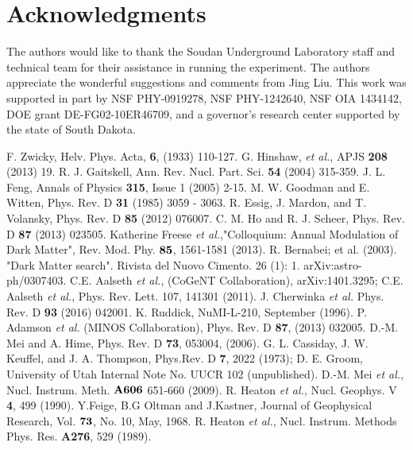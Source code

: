 \documentclass[aps,prc,showpacs,twocolumn,superscriptaddress]{revtex4-1}
\begin{document}
 \section*{Acknowledgments}
The authors would like to thank the Soudan Underground Laboratory staff and technical team for their assistance in running the experiment. The authors appreciate the wonderful suggestions and comments from Jing Liu. This work was supported in part by NSF PHY-0919278, NSF PHY-1242640, NSF OIA 1434142, DOE grant DE-FG02-10ER46709, and a governor's research center supported by the state of South Dakota.
\begin{thebibliography}{99}
 F. Zwicky, Helv. Phys. Acta, {\bf{6}}, (1933) 110-127.
 G. Hinshaw, {\it {et al.}}, APJS {\bf{208}} (2013) 19. 
 R. J. Gaitskell, Ann. Rev. Nucl. Part. Sci. {\bf{54}} (2004) 315-359.
 J. L. Feng, Annals of Physics {\bf{315}}, Issue 1 (2005) 2-15.
 M. W. Goodman and E. Witten, Phys. Rev. D {\bf{31}} (1985) 3059 - 3063. 
 R. Essig, J. Mardon, and T. Volansky, Phys. Rev. D {\bf{85}} (2012) 076007.
 C. M. Ho and R. J. Scheer, Phys. Rev. D {\bf{87}} (2013) 023505. 
 Katherine Freese {\it {et al.}},"Colloquium: Annual Modulation of Dark Matter", Rev. Mod. Phy. $\bf{85}$, 1561-1581 (2013).
 R. Bernabei; et al. (2003). "Dark Matter search". Rivista del Nuovo Cimento. 26 (1): 1. arXiv:astro-ph/0307403.
 C.E. Aalseth {\it{et al.}}, (CoGeNT Collaboration), arXiv:1401.3295; C.E. Aalseth {\it{et al.}}, Phys. Rev. Lett. 107, 141301 (2011).
 J. Cherwinka {\it {et al.}} Phys. Rev. D {\bf{93}} (2016) 042001. 
 K. Ruddick, NuMI-L-210, September (1996).
 P. Adamson {\it{et al.}} (MINOS Collaboration), Phys. Rev. D {\bf{87}}, (2013) 032005.
 D.-M. Mei and A. Hime, Phys. Rev. D {\bf{73}}, 053004, (2006).
 G. L. Cassiday, J. W. Keuffel, and J. A. Thompson, Phys.Rev. D {\bf{7}}, 2022 (1973); D. E. Groom, University of Utah Internal Note No. UUCR 102 (unpublished).
 D.-M. Mei {\it {et al.}}, Nucl. Instrum. Meth. $\bf{A606}$ 651-660 (2009).
 R. Heaton {\it {et al.}}, Nucl. Geophys. V {\bf{4}}, 499 (1990).
 Y.Feige, B.G Oltman and J.Kastner, Journal of Geophysical Research, Vol. $\bf{73}$, No. 10, May, 1968.
 R. Heaton {\it{et al.}}, Nucl. Instrum. Methods Phys. Res. {\bf{A276}}, 529 (1989).

\end{thebibliography}
\end{document}
